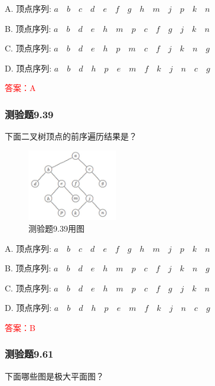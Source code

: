 \documentclass[UTF8, heading=true]{ctexart}
\begin{document}
A. 顶点序列: $a \quad b \quad c \quad d \quad e \quad f \quad g \quad h \quad m \quad j \quad p \quad k \quad n$

B. 顶点序列: $a \quad b \quad d \quad e \quad h \quad m \quad p \quad c \quad f \quad g \quad j \quad k \quad n$

C. 顶点序列: $a \quad b \quad d \quad e \quad h \quad p \quad m \quad c \quad f \quad j \quad k \quad n \quad g$

D. 顶点序列: $a \quad b \quad d \quad h \quad p \quad e \quad m \quad f \quad k \quad j \quad n \quad c \quad g$

\textcolor{red}{答案：A}

\subsubsection{测验题9.39}

下面二叉树顶点的前序遍历结果是？

\begin{figure}[htbp]
  \centering
  \includegraphics[width=0.35\textwidth]{9.39.jpg} %
  \caption{测验题9.39用图}
\end{figure}

A. 顶点序列: $a \quad b \quad c \quad d \quad e \quad f \quad g \quad h \quad m \quad j \quad p \quad k \quad n$

B. 顶点序列: $a \quad b \quad d \quad e \quad h \quad m \quad p \quad c \quad f \quad j \quad k \quad n \quad g$

C. 顶点序列: $a \quad b \quad d \quad e \quad h \quad m \quad p \quad c \quad f \quad g \quad j \quad k \quad n$

D. 顶点序列: $a \quad b \quad d \quad h \quad p \quad e \quad m \quad f \quad k \quad j \quad n \quad c \quad g$

\textcolor{red}{答案：B}

\subsubsection{测验题9.61}

下面哪些图是极大平面图？
\end{document}
